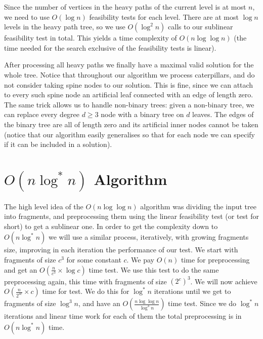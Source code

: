\documentclass[11pt,a4paper]{article}
\theoremstyle{definition}
\theoremstyle{remark}
\begin{document}
Since the number of vertices in the heavy paths of the current level is at most $n$, we need to use $O(\log n)$ feasibility tests for each level. There are at most $\log n$ levels in the heavy path tree, so we use $O(\log ^2n)$ calls to our sublinear feasibility test in total. This yields a time complexity of $O(n \log \log n)$ (the time needed for the search exclusive of the feasibility tests is linear).

After processing all heavy paths we finally have a maximal valid solution for the whole tree.
Notice that throughout our algorithm we process caterpillars, and do not consider taking spine nodes to our solution. 
This is fine, since we can attach to every such spine node an artificial leaf connected with an edge of length zero.
The same trick allows us to handle non-binary trees: given a non-binary tree, we can replace every 
degree $d\geq 3$ node with a binary tree on $d$ leaves. The edges of the binary tree are all of length zero and
its artificial inner nodes cannot be taken (notice that our algorithm easily generalises so that for each node
we can specify if it can be included in a solution).

\section{$O(n\log^{*}n)$ Algorithm}
The high level idea of the $O(n \log \log n)$ algorithm was dividing the input tree into fragments, and preprocessing them using the linear feasibility test (or test for short) to get a sublinear one. In order to get the complexity down to $O(n \log ^*n)$ we will use a similar process, iteratively, with growing fragments size, improving in each iteration the performance of our test.
We start with fragments of size $c^3$ for some constant $c$.
We pay $O(n)$ time for preprocessing and get an $O(\frac{n}{c^3} \times \log c)$ time test.
We use this test to do the same preprocessing again, this time with fragments of size $(2^c)^3$.
We will now achieve $O(\frac{n}{2^{3c}} \times c)$ time for test.
We do this for $\log ^*n$ iterations until we get to fragments of size $\log ^3n$, and have an $O(\frac{n \log \log n}{\log ^3n})$ time test. Since we do $\log ^*n$ iterations and linear time work for each of them the total preprocessing is in $O(n \log ^*n)$ time.
\end{document}
